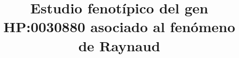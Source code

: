 \documentclass{bmcart}
\begin{document}
	\begin{frontmatter}
	
		\begin{fmbox}
			
			
			\title{Estudio fenotípico del gen HP:0030880 asociado al fenómeno de Raynaud}
			
			
			\author[
			  addressref={aff1},                   %
			  corref={aff1},                       %
			  email={juancaruru@uma.es}   %
			]{ } %
			\author[
			  addressref={aff1},
			  email={john.RS.Smith@cambridge.co.uk}
			]{ }
			
			
			\address[id=aff1]{%
			  ,             %
			  ,          %
			  ,                              %
			}
		
		\end{fmbox}%
		
		\begin{abstractbox}
		
			\begin{abstract} %
			
			
			\end{abstract}
			
			
			\begin{keyword}
			\end{keyword}
		
		
		\end{abstractbox}
	
	\end{frontmatter}
	
\end{document}
